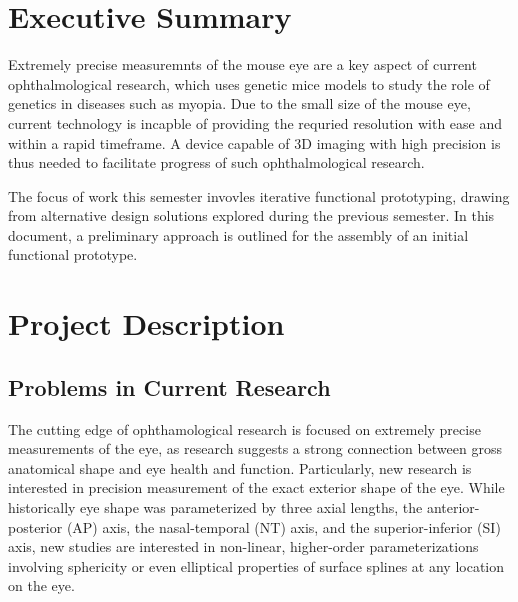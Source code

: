 \documentclass{article}
\begin{document}

\setcounter{tocdepth}{2}
\tableofcontents
\newpage
\section{Executive Summary}
\label{sec:exec-summary}
Extremely precise measuremnts of the mouse eye are a key aspect of current ophthalmological research, which uses genetic mice models to study the role of genetics in diseases such as myopia. Due to the small size of the mouse eye, current technology is incapble of providing the requried resolution with ease and within a rapid timeframe. A device capable of 3D imaging with high precision is thus needed to facilitate progress of such ophthalmological research. 

The focus of work this semester invovles iterative functional prototyping, drawing from alternative design solutions explored during the previous semester. In this document, a preliminary approach is outlined for the assembly of an initial functional prototype.



\section{Project Description}
\label{sec:project-description}

\subsection{Problems in Current Research}
\label{sec:probl-curr-rese}

The cutting edge of ophthamological research is focused on extremely precise measurements of the eye, as research suggests a strong connection between gross anatomical shape and eye health and function. Particularly, new research is interested in precision measurement of the exact exterior shape of the eye\cite{atchison04,zhou99:genes,zhou99:models,guggenheim04,wallman04}. While historically eye shape was parameterized by three axial lengths, the anterior-posterior (AP) axis, the nasal-temporal (NT) axis, and the superior-inferior (SI) axis, new studies are interested in non-linear, higher-order parameterizations involving sphericity or even elliptical properties of surface splines at any location on the eye.
\end{document}
